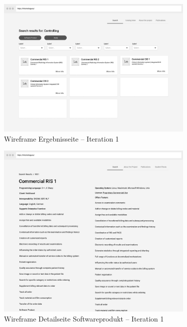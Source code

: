 \clearpage

\begin{figure}
	\centering
    	\includegraphics[width=0.85\textwidth]{Images/Desktop_3}
   	\caption{Wireframe Ergebnisseite -- Iteration 1}
\end{figure}

\clearpage

\begin{figure}
	\centering
    	\includegraphics[width=0.85\textwidth]{Images/Desktop_4}
   	\caption{Wireframe Detailseite Softwareprodukt -- Iteration 1}
\end{figure}
